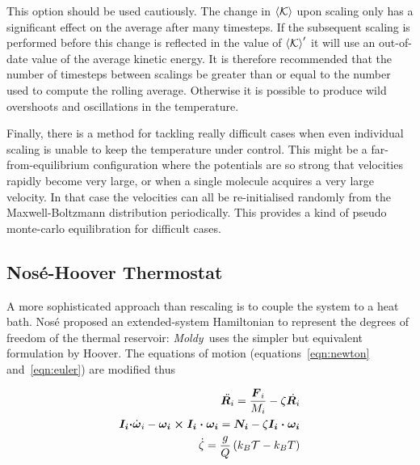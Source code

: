 \documentclass[twoside]{report}
\newcommand{\moldy}{{\em Moldy}}
\newcommand{\bm}[1]{\mbox{\boldmath \protect\(#1\protect\)}}
\begin{document}
This option should be used cautiously.  The change in $\left <{\cal
K}\right >$ upon scaling only has a significant effect on the average
after many timesteps. If the subsequent scaling is performed before
this change is reflected in the value of $\left < {\cal K}\right
>^\prime$ it will use an out-of-date value of the average kinetic
energy.  It is therefore recommended that the number of timesteps
between scalings be greater than or equal to the number used to
compute the rolling average.  Otherwise it is possible to produce wild
overshoots and oscillations in the temperature.

Finally, there is a method for tackling really difficult cases when
even individual scaling is unable to keep the temperature under
control.  This might be a far-from-equilibrium configuration where the
potentials are so strong that velocities rapidly become very large,
or when a single molecule acquires a very large velocity.  In that
case the velocities can all be re-initialised randomly from the
Maxwell-Boltzmann distribution periodically.  This provides a kind of
pseudo monte-carlo equilibration for difficult cases.

\subsection{Nos\'e-Hoover Thermostat}
\label{sec:const-temp}
A more sophisticated approach than rescaling is to couple the system
to a heat bath.  Nos\'e\cite{nose:84} proposed an extended-system
Hamiltonian to represent the degrees of freedom of the thermal
reservoir: \moldy\ uses the simpler but equivalent formulation by
Hoover\cite{hoover:85,allen:87}.  The equations of
motion (equations~\ref{eqn:newton} and~\ref{eqn:euler}) are modified thus

\begin{eqnarray}
\label{eqn:nhtherm}
\ddot{\bm{R}_i} = \frac{\bm{F}_i}{M_i} - \zeta \dot{\bm{R}_i}
\nonumber \\
\bm{I_i \cdot} \dot{\bm{\omega}}_i - \bm{\omega_i \times I_i \cdot
\omega_i} = \bm{N_i} - \zeta \bm{I_i \cdot \omega_i} \\
\dot{\zeta} = \frac{g}{Q}\left ( k_B {\cal T} - k_B T \right ) \nonumber 
\end{eqnarray}
\end{document}
